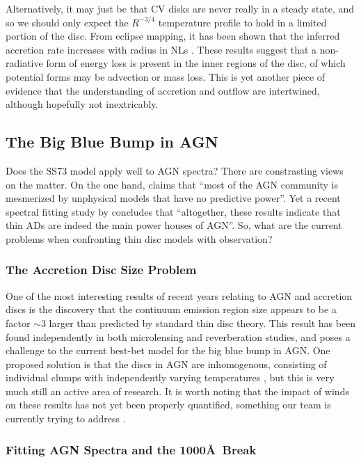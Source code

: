 Alternatively, it may just be that CV disks are never really in
a steady state, and so we should only expect the $R^{-3/4}$
temperature profile to hold in a limited portion of the disc.
From eclipse mapping, it has been shown that the inferred accretion
rate increases with radius in NLs \citep{rutten1992, horne1993}.
These results suggest that a non-radiative form of energy loss
is present in the inner regions of the disc, of which potential forms
may be advection or mass loss. This is yet another piece of evidence
that the understanding of accretion and outflow 
are intertwined, although hopefully not inextricably.

\subsection{The Big Blue Bump in AGN}

Does the SS73 model apply well to AGN spectra? There are constrasting views on the matter.
On the one hand, \cite{antonucci2013} claims that ``most of the AGN community is mesmerized by unphysical models that have no predictive power''. 
Yet a recent spectral fitting study by \cite{capellupo2015} concludes that 
``altogether, these results indicate that thin ADs are indeed the 
main power houses of AGN''. So, what are the current problems when 
confronting thin disc models with observation? 

\subsubsection{The Accretion Disc Size Problem}

One of the most interesting results of recent years relating to AGN and accretion discs is
the discovery that the continuum emission region size appears to be
a factor $\sim3$ larger than predicted by standard thin disc theory. This result
has been found independently in both microlensing \citep{morgan2010,dai2010} 
and reverberation \citep{edelson2015} studies, and poses a challenge to the 
current best-bet model for the big blue bump in AGN. 
One proposed solution is that the discs in AGN are inhomogenous,
consisting of individual clumps with independently
varying temperatures \citep{dexteragol2011}, but this is very much
still an active area of research. It is worth noting that the impact
of winds on these results has not yet been properly quantified, something
our team is currently trying to address \citep{mangham}.

\subsubsection{Fitting AGN Spectra and the 1000\AA\ Break}

